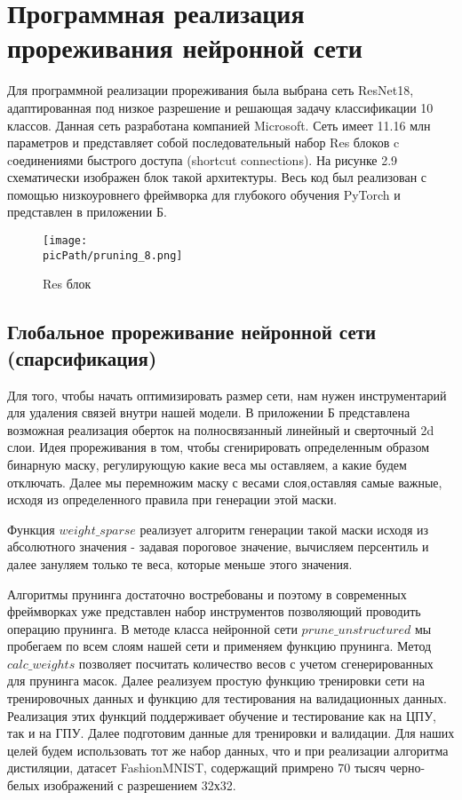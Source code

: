\documentclass[oneside,final,12pt]{extreport}
\newcommand{\picPath}{images}
\begin{document}
\section{Программная реализация прореживания нейронной сети}
Для программной реализации прореживания была выбрана сеть ResNet18, адаптированная под низкое разрешение и решающая задачу классификации 10 классов. Данная сеть разработана компанией Microsoft. Сеть имеет 11.16 млн параметров и представляет собой последовательный набор Res блоков c cоединениями быстрого доступа (shortcut connections). На рисунке 2.9 схематически изображен блок такой архитектуры. Весь код был реализован с помощью низкоуровнего фреймворка для глубокого обучения PyTorch и представлен в приложении Б. 
\begin{figure}[H]
\begin{center}
  \texttt{[image: \\picPath/pruning\_8.png]}
  \caption{Res блок}
  \label{fig:pruning_8}
  \end{center}
\end{figure}

\subsection{Глобальное прореживание нейронной сети (спарсификация)}

Для того, чтобы начать оптимизировать размер сети, нам нужен инструментарий для удаления связей внутри нашей модели. В приложении Б представлена возможная реализация оберток на полносвязанный линейный и сверточный 2d слои. Идея прореживания в том, чтобы сгенирировать определенным образом бинарную маску, регулирующую какие веса мы оставляем, а какие будем отключать. Далее мы перемножим маску с весами слоя,оставляя самые важные, исходя из определенного правила при генерации этой маски.

Функция $weight\_sparse$ реализует алгоритм генерации такой маски исходя из абсолютного значения - задавая пороговое значение, вычисляем персентиль и далее зануляем только те веса, которые меньше этого значения.

Алгоритмы прунинга достаточно востребованы и поэтому в современных фреймворках уже представлен набор инструментов позволяющий проводить операцию прунинга. В методе класса нейронной сети $prune\_unstructured$ мы пробегаем по всем слоям нашей сети и применяем функцию прунинга. Метод $calc\_weights$ позволяет посчитать количество весов с учетом сгенерированных для прунинга масок. Далее реализуем простую функцию тренировки сети на тренировочных данных и функцию для тестирования на валидационных данных. Реализация этих функций поддерживает обучение и тестирование как на ЦПУ, так и на ГПУ. Далее подготовим данные для тренировки и валидации. Для наших целей будем использовать тот же набор данных, что и при реализации алгоритма дистиляции, датасет FashionMNIST, содержащий примрено 70 тысяч черно-белых изображений с разрешением 32х32. 
\end{document}
